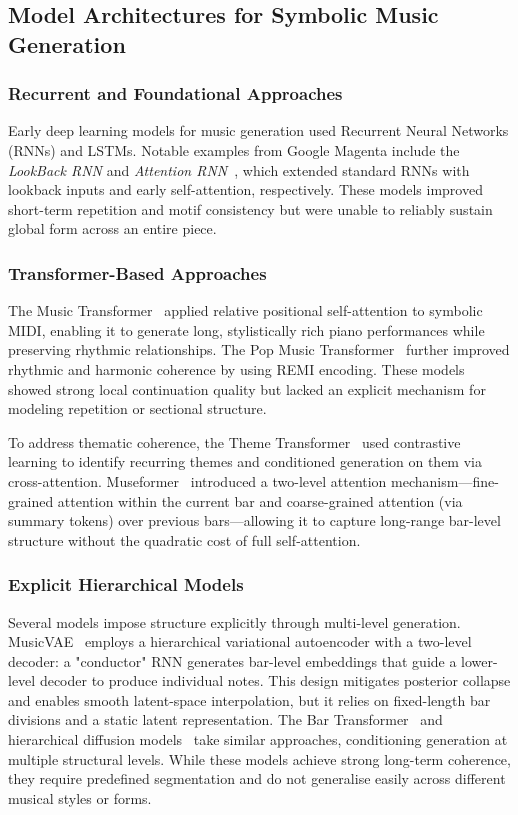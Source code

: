 \documentclass[conference]{IEEEtran}
\begin{document}
\subsection{Model Architectures for Symbolic Music Generation}
\label{ssec:arch}

\subsubsection{Recurrent and Foundational Approaches}
Early deep learning models for music generation used Recurrent Neural Networks (RNNs) and LSTMs. Notable examples from Google Magenta include the \emph{LookBack RNN} and \emph{Attention RNN}~\cite{waite2016}, which extended standard RNNs with lookback inputs and early self-attention, respectively. These models improved short-term repetition and motif consistency but were unable to reliably sustain global form across an
entire piece.

\subsubsection{Transformer-Based Approaches}
The Music Transformer~\cite{huang2019} applied relative positional
self-attention to symbolic MIDI, enabling it to generate long, stylistically rich piano performances while preserving rhythmic relationships. The Pop Music Transformer~\cite{huang2020} further improved rhythmic and harmonic coherence by using REMI encoding. These models showed strong local continuation quality but lacked an explicit mechanism for modeling repetition or sectional structure.

To address thematic coherence, the Theme Transformer~\cite{shih2021} used contrastive learning to identify recurring themes and conditioned
generation on them via cross-attention. 
Museformer~\cite{yu2022} introduced a two-level attention mechanism—fine-grained attention within the current bar and coarse-grained attention (via summary tokens) over previous bars—allowing it to capture long-range bar-level structure without the quadratic cost of full self-attention.

\subsubsection{Explicit Hierarchical Models}
Several models impose structure explicitly through multi-level
generation. MusicVAE~\cite{roberts2018} employs a hierarchical
variational autoencoder with a two-level decoder: a "conductor" RNN
generates bar-level embeddings that guide a lower-level decoder to
produce individual notes. This design mitigates posterior collapse and
enables smooth latent-space interpolation, but it relies on fixed-length
bar divisions and a static latent representation. The Bar
Transformer~\cite{qin2023} and hierarchical diffusion
models~\cite{wang2024} take similar approaches, conditioning generation
at multiple structural levels. While these models achieve strong
long-term coherence, they require predefined segmentation and do not
generalise easily across different musical styles or forms.
\end{document}
